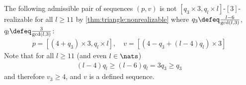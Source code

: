 \begin{example}
  The following admissible pair of sequences $(p, v)$ is not $[q_3 \times 3, q_l \times l]$-$[3]$-realizable for all $l \geq 11$ by \autoref{thm:triangle:nonrealizable} where $q_3 \defeq \tfrac{l - 6}{\gcd(l, 3)}$, $q_l \defeq \tfrac{3}{\gcd(l, 3)}$:
  \begin{align*}
    p = [(4 + q_3) \times 3, q_l \times l],\quad v = [(4 - q_3 + (l - 4)q_l) \times 3]
  \end{align*}
  Note that for all $l \geq 11$ (and even $l \in \nats$) 
  \begin{align*}
    (l - 4)q_l \geq (l - 6)q_l = 3q_3 \geq q_3
  \end{align*}
  and therefore $v_3 \geq 4$, and $v$ is a defined sequence.
\end{example}
